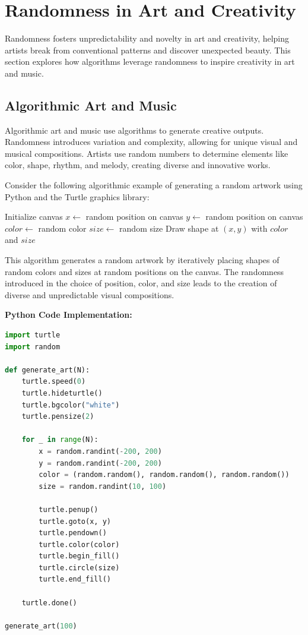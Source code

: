 \documentclass[12pt]{book} %
\begin{document}
\section{Randomness in Art and Creativity}

Randomness fosters unpredictability and novelty in art and creativity, helping artists break from conventional patterns and discover unexpected beauty. This section explores how algorithms leverage randomness to inspire creativity in art and music.

\subsection{Algorithmic Art and Music}

Algorithmic art and music use algorithms to generate creative outputs. Randomness introduces variation and complexity, allowing for unique visual and musical compositions. Artists use random numbers to determine elements like color, shape, rhythm, and melody, creating diverse and innovative works.

Consider the following algorithmic example of generating a random artwork using Python and the Turtle graphics library:
\FloatBarrier
\begin{algorithm}
\caption{Random Art Generation}\label{alg:random_art}
\begin{algorithmic}[1]
\State Initialize canvas
 
    \State $x \gets$ random position on canvas
    \State $y \gets$ random position on canvas
    \State $color \gets$ random color
    \State $size \gets$ random size
    \State Draw shape at $(x, y)$ with $color$ and $size$
\EndFor
\EndProcedure
\end{algorithmic}
\end{algorithm}
\FloatBarrier

This algorithm generates a random artwork by iteratively placing shapes of random colors and sizes at random positions on the canvas. The randomness introduced in the choice of position, color, and size leads to the creation of diverse and unpredictable visual compositions.

\textbf{Python Code Implementation:}
\FloatBarrier
\begin{lstlisting}[language=Python, caption=Python implementation of Random Art Generation]
import turtle
import random

def generate_art(N):
    turtle.speed(0)
    turtle.hideturtle()
    turtle.bgcolor("white")
    turtle.pensize(2)

    for _ in range(N):
        x = random.randint(-200, 200)
        y = random.randint(-200, 200)
        color = (random.random(), random.random(), random.random())
        size = random.randint(10, 100)
        
        turtle.penup()
        turtle.goto(x, y)
        turtle.pendown()
        turtle.color(color)
        turtle.begin_fill()
        turtle.circle(size)
        turtle.end_fill()

    turtle.done()

generate_art(100)
\end{lstlisting}
\FloatBarrier
\end{document}

